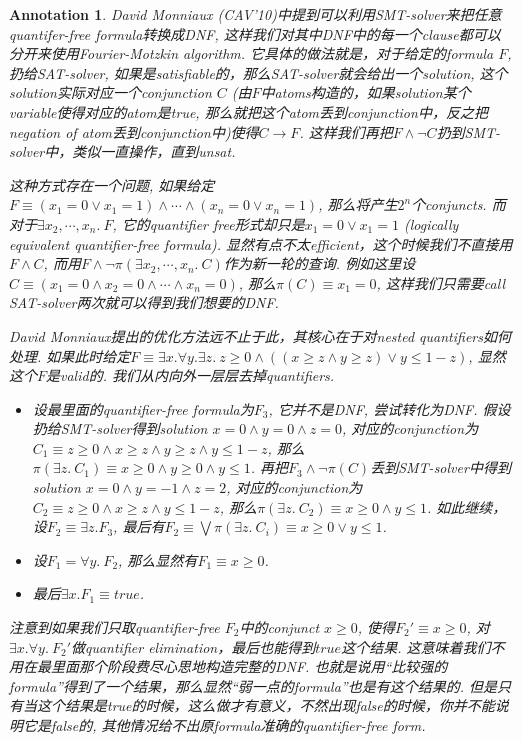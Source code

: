 \documentclass{article}
\newtheorem{annotation}[theorem]{Annotation}
\begin{document}
\begin{annotation}
\rm David Monniaux (CAV'10)中提到可以利用SMT-solver来把任意quantifer-free formula转换成DNF, 这样我们对其中DNF中的每一个clause都可以分开来使用Fourier-Motzkin algorithm. 它具体的做法就是，对于给定的formula $F$, 扔给SAT-solver, 如果是satisfiable的，那么SAT-solver就会给出一个solution, 这个solution实际对应一个conjunction $C$ (由$F$中atoms构造的，如果solution某个variable使得对应的atom是true, 那么就把这个atom丢到conjunction中，反之把negation of atom丢到conjunction中)使得$C \rightarrow F$. 这样我们再把$F \wedge \neg C$扔到SMT-solver中，类似一直操作，直到unsat. 

这种方式存在一个问题, 如果给定$F \equiv (x_1 = 0 \vee x_1 = 1) \wedge \cdots \wedge (x_n = 0 \vee x_n = 1)$, 那么将产生$2^n$个conjuncts. 而对于$\exists x_2,\cdots,x_n.~F$, 它的quantifier free形式却只是$x_1 = 0 \vee x_1 = 1$ (logically equivalent quantifier-free formula). 显然有点不太efficient，这个时候我们不直接用$F \wedge C$, 而用$F \wedge \neg \pi(\exists x_2,\cdots,x_n.~C)$作为新一轮的查询. 例如这里设$C \equiv (x_1 = 0 \wedge x_2 = 0 \wedge \cdots \wedge x_n = 0)$, 那么$\pi(C) \equiv x_1 = 0$, 这样我们只需要call SAT-solver两次就可以得到我们想要的DNF. 

David Monniaux提出的优化方法远不止于此，其核心在于对nested quantifiers如何处理. 如果此时给定$F \equiv \exists x.\forall y.\exists z. ~ z \geq 0 \wedge ((x \geq z \wedge y \geq z) \vee y \leq 1 - z)$, 显然这个$F$是valid的. 我们从内向外一层层去掉quantifiers.
\begin{itemize}
    \item 设最里面的quantifier-free formula为$F_3$, 它并不是DNF, 尝试转化为DNF. 假设扔给SMT-solver得到solution $x = 0 \wedge y =0 \wedge z = 0$, 对应的conjunction为$C_1 \equiv z \geq 0 \wedge x \geq z \wedge y \geq z \wedge y \leq 1 - z$, 那么$\pi(\exists z.~C_1) \equiv x \geq 0 \wedge y \geq 0 \wedge y \leq 1$. 再把$F_3 \wedge \neg \pi(C)$丢到SMT-solver中得到solution $x = 0 \wedge y = -1 \wedge z = 2$, 对应的conjunction为$C_2 \equiv z \geq 0 \wedge x \geq z \wedge y \leq 1 - z$, 那么$\pi(\exists z.~C_2) \equiv x \geq 0 \wedge y \leq 1$. 如此继续，设$F_2 \equiv \exists z. F_3$, 最后有$F_2 \equiv \bigvee \pi(\exists z.~C_i) \equiv x \geq 0 \vee y \leq 1$. 
    \item 设$F_1 = \forall y.~F_2$, 那么显然有$F_1 \equiv x \geq 0$.
    \item 最后$\exists x. F_1 \equiv true$.
\end{itemize}
注意到如果我们只取quantifier-free $F_2$中的conjunct $x \geq 0$, 使得$F_2' \equiv x \geq 0$, 对$\exists x.\forall y. ~F_2'$做quantifier elimination，最后也能得到$true$这个结果. 这意味着我们不用在最里面那个阶段费尽心思地构造完整的DNF. 也就是说用“比较强的formula”得到了一个结果，那么显然“弱一点的formula”也是有这个结果的. 但是只有当这个结果是true的时候，这么做才有意义，不然出现false的时候，你并不能说明它是false的, 其他情况给不出原formula准确的quantifier-free form.


\end{annotation}
\end{document}
